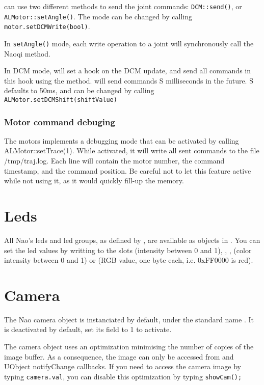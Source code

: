 \urbi can use two different methods to send the joint commands:
\lstinline|DCM::send()|, or \lstinline|ALMotor::setAngle()|.
The mode can be changed by calling \lstinline|motor.setDCMWrite(bool)|.

In \lstinline|setAngle()| mode, each write operation to a joint will
synchronously call the  Naoqi method.

In DCM mode, \urbi will set a hook on the DCM update,
and send all commands in this hook using the  method.
\urbi will send commands S milliseconds in the future. S
defaults to 50ms, and can be changed by calling
\lstinline|ALMotor.setDCMShift(shiftValue)|

\subsubsection{Motor command debuging}

The motors implements a debugging mode that can be activated by calling
ALMotor::setTrace(1). While activated, it will write all sent commands to the
file /tmp/traj.log. Each line  will contain the motor number, the command
timestamp, and the command position.
Be careful not to let this feature active while not using it, as it would
quickly fill-up the memory.

\section{Leds}

All Nao's leds and led groups, as defined by \naoqi, are available as objects in
\us. You can set the led values by writting to the slots  (intensity
between 0 and 1), , ,  (color intensity between 0 and 1)
 or  (RGB value, one byte each, i.e. 0xFF0000 is red).

\section{Camera}

The Nao camera object is instanciated by default, under the standard name
. It is deactivated by default, set its  field to 1 to
activate.

The camera object uses an optimization minimising the number of copies of the
image buffer. As a consequence, the image can only be accessed from \us and
UObject notifyChange callbacks. If you need to access the camera image by
typing \lstinline|camera.val|, you can disable this optimization by typing
\lstinline|showCam();|

